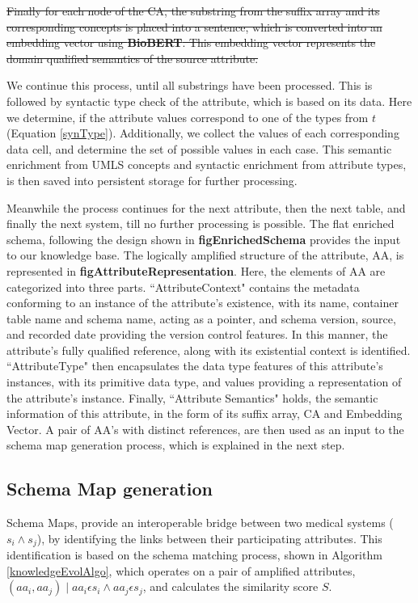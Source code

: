 \st{Finally for each node of the CA, the substring from the suffix array and its corresponding concepts is placed into a sentence, which is converted into an embedding vector using \textbf{BioBERT}. This embedding vector represents the domain qualified semantics of the source attribute.}

We continue this process, until all substrings have been processed. This is followed by syntactic type check of the attribute, which is based on its data. Here we determine, if the attribute values correspond to one of the types from $t$ (Equation \eqref{synType}). Additionally, we collect the values of each corresponding data cell, and determine the set of possible values in each case. 
This semantic enrichment from UMLS concepts and syntactic enrichment from attribute types, is then saved into persistent storage for further processing. 

Meanwhile the process continues for the next attribute, then the next table, and finally the next system, till no further processing is possible. The flat enriched schema, following the design shown in \textbf{figEnrichedSchema} provides the input to our knowledge base. The logically amplified structure of the attribute, AA, is represented in \textbf{figAttributeRepresentation}. Here, the elements of AA are categorized into three parts. ``AttributeContext" contains the metadata conforming to an instance of the attribute's existence,  with its name, container table name and schema name, acting as a pointer, and schema version, source, and recorded date providing the version control features. In this manner, the attribute's fully qualified reference, along with its existential context is identified. ``AttributeType" then encapsulates the data type features of this attribute's instances, with its primitive data type, and values providing a representation of the attribute's instance. Finally, ``Attribute Semantics" holds, the semantic information of this attribute, in the form of its suffix array, CA and Embedding Vector.
A pair of AA's with distinct references, are then used as an input to the schema map generation process, which is explained in the next step.

\subsection*{Schema Map generation}
\label{schema_map_gen}
Schema Maps, provide an interoperable bridge between two medical systems ($s_i \wedge s_j$), by identifying the links between their participating attributes. This identification is based on the schema matching process, shown in Algorithm \ref{knowledgeEvolAlgo}, which operates on a pair of amplified attributes, $\left ( aa_i,aa_j \right ) \mid aa_i \epsilon s_i \wedge aa_j \epsilon s_j$, and calculates the similarity score $S$.


